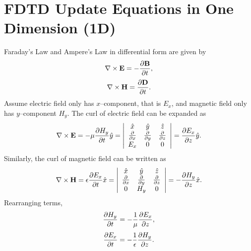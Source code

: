 \section{FDTD Update Equations in One Dimension (1D)}
Faraday's Law and Ampere's Law in differential form are given by
\begin{equation}
\centering
\nabla \times \textbf{E} = - \dfrac{\partial \textbf{B}}{\partial t},
\label{Faraday's Law}
\end{equation}
\begin{equation}
\centering
\nabla \times \textbf{H} = \dfrac{\partial \textbf{D}}{\partial t}.
\label{Ampere's Law}
\end{equation}
Assume electric field only has $x$--component, that is $E_x$, and magnetic field only has $y$--component $H_y$. The curl of electric field can be expanded as
\begin{equation}
\centering
\nabla \times \textbf{E} = - \mu \dfrac{\partial H_y}{\partial t} \hat{y} = \left| \begin{array}{ccc} \hat{x} & \hat{y} & \hat{z} \\ \frac{\partial}{\partial x} & \frac{\partial}{\partial y} & \frac{\partial}{\partial z} \\ E_x & 0 & 0 \end{array} \right| = \dfrac{\partial E_x}{\partial z} \hat{y}.
\label{Faraday's Law-Curl-Expansion}
\end{equation}
Similarly, the curl of magnetic field can be written as
\begin{equation}
\centering
\nabla \times \textbf{H} = \epsilon \dfrac{\partial E_x}{\partial t} \hat{x} = \left| \begin{array}{ccc} \hat{x} & \hat{y} & \hat{z} \\ \frac{\partial}{\partial x} & \frac{\partial}{\partial y} & \frac{\partial}{\partial z} \\ 0 & H_y & 0 \end{array} \right| = - \dfrac{\partial H_y}{\partial z} \hat{x}.
\label{Ampere's Law-Curl-Expansion}
\end{equation}
Rearranging terms,
\begin{equation}
\centering
\dfrac{\partial H_y}{\partial t} = - \dfrac{1}{\mu} \dfrac{\partial E_x}{\partial z},
\label{Faraday's Law-Curl-Expansion-1D}
\end{equation}
\begin{equation}
\centering
\dfrac{\partial E_x}{\partial t} = - \dfrac{1}{\epsilon} \dfrac{\partial H_y}{\partial z}.
\label{Ampere's Law-Curl-Expansion-1D}
\end{equation}
